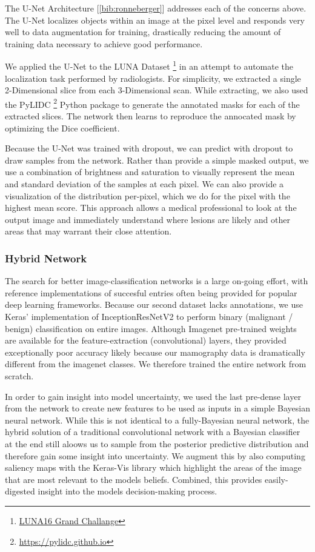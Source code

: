 \documentclass[12pt]{article}
\begin{document}
{The U-Net Architecture [\ref{bib:ronneberger}] addresses each of the concerns above. The U-Net localizes objects within an image at the pixel level and responds very well to data augmentation for training, drastically reducing the amount of training data necessary to achieve good performance.

We applied the U-Net to the LUNA Dataset \footnote{\href{http://luna16.grand-challenge.org}{LUNA16 Grand Challange}} in an attempt to automate the localization task performed by radiologists. For simplicity, we extracted a single 2-Dimensional slice from each 3-Dimensional scan. While extracting, we also used the PyLIDC \footnote{\href{https://pylidc.github.io}{https://pylidc.github.io}} Python package to generate the annotated masks for each of the extracted slices. The network then learns to reproduce the annocated mask by optimizing the Dice coefficient.

Because the U-Net was trained with dropout, we can predict with dropout to draw samples from the network. Rather than provide a simple masked output, we use a combination of brightness and saturation to visually represent the mean and standard deviation of the samples at each pixel. We can also provide a visualization of the distribution per-pixel, which we do for the pixel with the highest mean score. This approach allows a medical professional to look at the output image and immediately understand where lesions are likely and other areas that may warrant their close attention.

\subsubsection*{Hybrid Network}
The search for better image-classification networks is a large on-going effort, with reference implementations of succesful entries often being provided for popular deep learning frameworks. Because our second dataset lacks annotations, we use Keras' implementation of InceptionResNetV2 to perform binary (malignant / benign) classification on entire images. Although Imagenet pre-trained weights are available for the feature-extraction (convolutional) layers, they provided exceptionally poor accuracy likely because our mamography data is dramatically different from the imagenet classes. We therefore trained the entire network from scratch.

In order to gain insight into model uncertainty, we used the last pre-dense layer from the network to create new features to be used as inputs in a simple Bayesian neural network. While this is not identical to a fully-Bayesian neural network, the hybrid solution of a traditional convolutional network with a Bayesian classifier at the end still aloows us to sample from the posterior predictive distribution and therefore gain some insight into uncertainty. We augment this by also computing saliency maps with the Keras-Vis library which highlight the areas of the image that are most relevant to the models beliefs. Combined, this provides easily-digested insight into the models decision-making process.

}
\end{document}
